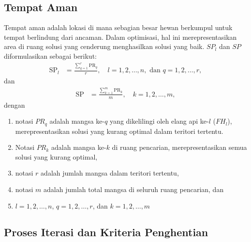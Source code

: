 \subsection{Tempat Aman}
Tempat aman adalah lokasi di mana sebagian besar hewan berkumpul untuk tempat berlindung dari ancaman. Dalam optimisasi, hal ini merepresentasikan area di ruang solusi yang cenderung menghasilkan solusi yang baik. $SP_l$ dan $SP$ diformulasikan sebagai berikut:
\begin{align}
    \text{SP}_l &= \frac{\sum_{q=1}^r \text{PR}_q}{r}, \quad l = 1, 2, \ldots, n,  \text{ dan } q = 1, 2, \ldots, r,
\end{align}
dan
\begin{align}
    \text{SP} &= \frac{\sum_{k=1}^m \text{PR}_k}{m}, \quad k = 1, 2, \ldots, m,
\end{align}
dengan
\begin{enumerate}
    \item notasi $PR_q$ adalah mangsa ke-$q$ yang dikelilingi oleh elang api ke-$l$ ($FH_l$), merepresentasikan solusi yang kurang optimal dalam teritori tertentu.
    \item Notasi $PR_k$ adalah mangsa ke-$k$ di ruang pencarian, merepresentasikan semua solusi yang kurang optimal,
    \item notasi $r$ adalah jumlah mangsa dalam teritori tertentu,
    \item notasi $m$ adalah jumlah total mangsa di seluruh ruang pencarian, dan
    \item $l = 1, 2, \ldots, n$,  $q = 1, 2, \ldots, r$, dan $k = 1,2, \ldots, m$
\end{enumerate}

\subsection{Proses Iterasi dan Kriteria Penghentian}

